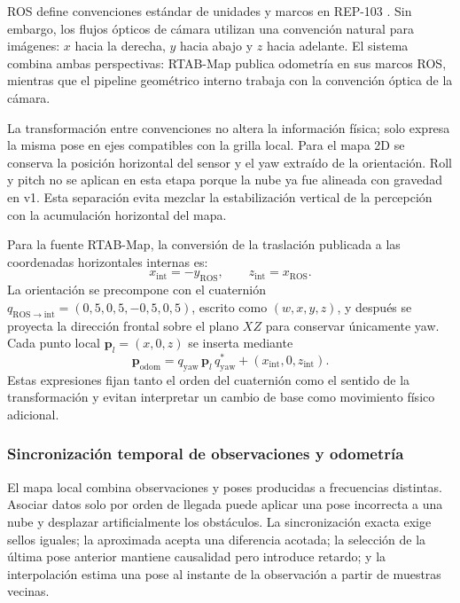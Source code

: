 ROS define convenciones estándar de unidades y marcos en REP-103 \cite{REP103}. Sin embargo,
los flujos ópticos de cámara utilizan una convención natural para imágenes: $x$ hacia la
derecha, $y$ hacia abajo y $z$ hacia adelante. El sistema combina ambas perspectivas: RTAB-Map
publica odometría en sus marcos ROS, mientras que el pipeline geométrico interno trabaja con
la convención óptica de la cámara.

La transformación entre convenciones no altera la información física; solo expresa la misma
pose en ejes compatibles con la grilla local. Para el mapa 2D se conserva la posición
horizontal del sensor y el yaw extraído de la orientación. Roll y pitch no se aplican en esta
etapa porque la nube ya fue alineada con gravedad en v1. Esta separación evita mezclar la
estabilización vertical de la percepción con la acumulación horizontal del mapa.

Para la fuente RTAB-Map, la conversión de la traslación publicada a las coordenadas
horizontales internas es:
\begin{equation}
  x_{\mathrm{int}}=-y_{\mathrm{ROS}},\qquad
  z_{\mathrm{int}}=x_{\mathrm{ROS}}.
  \label{eq:rtab-position-convention}
\end{equation}
La orientación se precompone con el cuaternión
$q_{\mathrm{ROS}\rightarrow\mathrm{int}}=(0{,}5,0{,}5,-0{,}5,0{,}5)$, escrito como
$(w,x,y,z)$, y después se proyecta la dirección frontal sobre el plano $XZ$ para conservar
únicamente yaw. Cada punto local $\mathbf p_l=(x,0,z)$ se inserta mediante
\begin{equation}
  \mathbf p_{\mathrm{odom}}=q_{\mathrm{yaw}}\,\mathbf p_l\,q_{\mathrm{yaw}}^*
  +(x_{\mathrm{int}},0,z_{\mathrm{int}}).
  \label{eq:local-to-odom}
\end{equation}
Estas expresiones fijan tanto el orden del cuaternión como el sentido de la transformación y
evitan interpretar un cambio de base como movimiento físico adicional.

\subsubsection{Sincronización temporal de observaciones y odometría}

El mapa local combina observaciones y poses producidas a frecuencias distintas. Asociar datos solo
por orden de llegada puede aplicar una pose incorrecta a una nube y desplazar artificialmente los
obstáculos. La sincronización exacta exige sellos iguales; la aproximada acepta una diferencia
acotada; la selección de la última pose anterior mantiene causalidad pero introduce retardo; y la
interpolación estima una pose al instante de la observación a partir de muestras vecinas.

